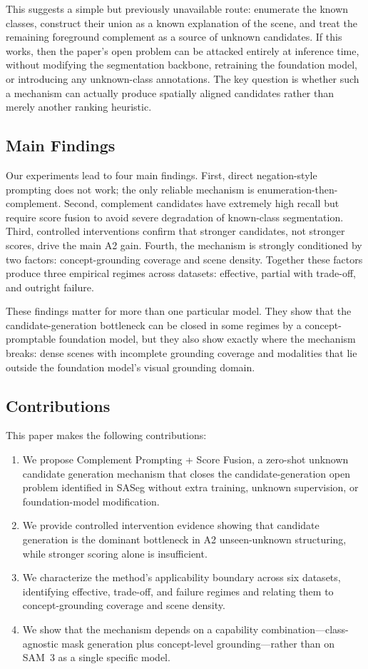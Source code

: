 \documentclass[a4paper,fleqn]{cas-dc}
\newcommand{\method}{Complement Prompting + Score Fusion}
\newcommand{\samthree}{SAM~3}
\begin{document}
This suggests a simple but previously unavailable route: enumerate the known classes, construct their union as a known explanation of the scene, and treat the remaining foreground complement as a source of unknown candidates. If this works, then the paper's open problem can be attacked entirely at inference time, without modifying the segmentation backbone, retraining the foundation model, or introducing any unknown-class annotations. The key question is whether such a mechanism can actually produce spatially aligned candidates rather than merely another ranking heuristic.

\subsection{Main Findings}
\label{sec:intro:findings}

Our experiments lead to four main findings. First, direct negation-style prompting does not work; the only reliable mechanism is enumeration-then-complement. Second, complement candidates have extremely high recall but require score fusion to avoid severe degradation of known-class segmentation. Third, controlled interventions confirm that stronger candidates, not stronger scores, drive the main A2 gain. Fourth, the mechanism is strongly conditioned by two factors: concept-grounding coverage and scene density. Together these factors produce three empirical regimes across datasets: effective, partial with trade-off, and outright failure.

These findings matter for more than one particular model. They show that the candidate-generation bottleneck can be closed in some regimes by a concept-promptable foundation model, but they also show exactly where the mechanism breaks: dense scenes with incomplete grounding coverage and modalities that lie outside the foundation model's visual grounding domain.

\subsection{Contributions}
\label{sec:intro:contrib}

This paper makes the following contributions:
\begin{enumerate}
  \item We propose \method, a zero-shot unknown candidate generation mechanism that closes the candidate-generation open problem identified in SASeg without extra training, unknown supervision, or foundation-model modification.
  \item We provide controlled intervention evidence showing that candidate generation is the dominant bottleneck in A2 unseen-unknown structuring, while stronger scoring alone is insufficient.
  \item We characterize the method's applicability boundary across six datasets, identifying effective, trade-off, and failure regimes and relating them to concept-grounding coverage and scene density.
  \item We show that the mechanism depends on a capability combination---class-agnostic mask generation plus concept-level grounding---rather than on \samthree{} as a single specific model.
\end{enumerate}
\end{document}
